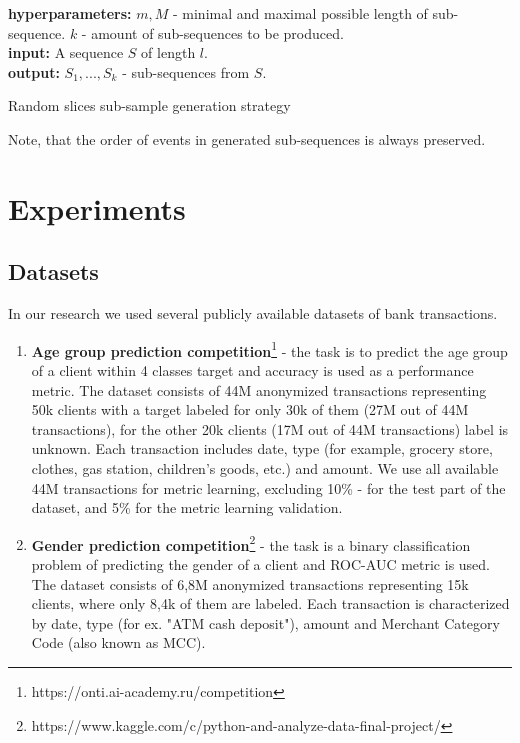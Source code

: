 \documentclass[sigconf, anonymous]{acmart}
\begin{document}
\begin{algorithm}
\SetAlgoLined
\textbf{hyperparameters:} $m, M$ - minimal and maximal possible length of sub-sequence. $k$ - amount of sub-sequences to be produced. \\
\textbf{input:} A sequence $S$ of length $l$. \\
\textbf{output:} $S_1,...,S_k$ - sub-sequences from $S$. \\
\BlankLine
 \caption{Random slices sub-sample generation strategy}
\label{alg-slce-ss}
\end{algorithm}

Note, that the order of events in generated sub-sequences is always preserved.

\section{Experiments} \label{sec-exp}

\subsection{Datasets} \label{sec-datasets}
In our research we used several publicly available datasets of bank transactions.
\begin{enumerate}
    \item \textbf{Age group prediction competition}\footnote{https://onti.ai-academy.ru/competition} - the task is to predict the age group of a client within 4 classes target and accuracy is used as a performance metric.
    The dataset consists of 44M anonymized transactions representing 50k clients with a target labeled for only 30k of them (27M out of 44M transactions), for the other 20k clients (17M out of 44M transactions) label is unknown. Each transaction includes date, type (for example, grocery store, clothes, gas station, children's goods, etc.) and amount. We use all available 44M transactions for metric learning, excluding 10\% - for the test part of the dataset, and  5\% for the metric learning validation.
        
    \item \textbf{Gender prediction competition}\footnote{https://www.kaggle.com/c/python-and-analyze-data-final-project/} - the task is a binary classification problem of predicting the gender of a client and ROC-AUC metric is used.
    The dataset consists of 6,8M anonymized transactions representing 15k clients, where only 8,4k of them are labeled. Each transaction is characterized by date, type (for ex. "ATM cash deposit"), amount and Merchant Category Code (also known as MCC).
\end{enumerate}
\end{document}
